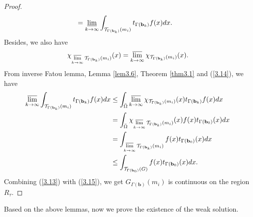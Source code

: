 \documentclass[a4paper,12pt,]{article}
\numberwithin{equation}{section}
\numberwithin{equation}{section} \allowdisplaybreaks
\begin{document}
\begin{proof}
\begin{equation}
\begin{aligned}
    & = \varliminf\limits_{k \rightarrow \infty} \int_{\mathcal{T}_{\Gamma({\mathbf{b}_{k}})}(m_{i})}t_{\Gamma({\mathbf{b}_{k}})}f(x)dx.
    \end{aligned}
  \end{equation}
  Besides, we also have
  \begin{equation}\label{3.14}
    \chi_{\varlimsup\limits_{k \rightarrow \infty} \mathcal{T}_{\Gamma({\mathbf{b}_{k}})}(m_{i})}(x) = \varlimsup\limits_{k \rightarrow \infty} \chi_{\mathcal{T}_{\Gamma({\mathbf{b}_{k}})}(m_{i})}(x).
  \end{equation}
  From inverse Fatou lemma, Lemma \ref{lem3.6}, Theorem \ref{thm3.1} and (\ref{3.14}), we have
  \begin{equation}\label{3.15}
    \begin{aligned}
     \varlimsup\limits_{k \rightarrow \infty} \int_{\mathcal{T}_{\Gamma({\mathbf{b}_{k}})}(m_{i})}t_{\Gamma({\mathbf{b}_{k}})}f(x)dx  & \leq \int_{\bar{\Omega}}\varlimsup\limits_{k \rightarrow \infty} \chi_{\mathcal{T}_{\Gamma({\mathbf{b}_{k}})}(m_{i})}(x)t_{\Gamma({\mathbf{b}_{k}})}f(x)dx  \\
     & = \int_{\bar{\Omega}}\chi_{\varlimsup\limits_{k \rightarrow \infty} \mathcal{T}_{\Gamma({\mathbf{b}_{k}})}(m_{i})}(x)f(x)t_{\Gamma(\mathbf{b}_{0})}(x)dx \\
     & = \int_{\varlimsup\limits_{k \rightarrow \infty} \mathcal{T}_{\Gamma({\mathbf{b}_{k}})}(m_{i})}f(x)t_{\Gamma(\mathbf{b}_{0})}(x)dx \\
     & \leq \int_{\mathcal{T}_{\Gamma({\mathbf{b}_{0}})}(G)}f(x)t_{\Gamma(\mathbf{b}_{0})}(x)dx.
    \end{aligned}
  \end{equation}
  Combining (\ref{3.13}) with (\ref{3.15}), we get $G_{\Gamma(\mathbf{b})}(m_{i})$ is continuous on the region $R_{\tau}$.
\end{proof}

Based on the above lemmas, now we prove the existence of the weak solution.
\end{document}
